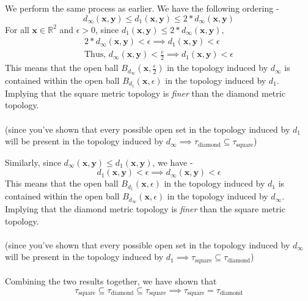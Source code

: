 \begin{frame}
    We perform the same process as earlier. We have the following ordering -
    \begin{equation*}
        d_\infty(\boldsymbol{x}, \boldsymbol{y}) \leq d_1(\boldsymbol{x}, \boldsymbol{y}) \leq 2*d_\infty(\boldsymbol{x}, \boldsymbol{y})
    \end{equation*}
    \pause
    For all $\boldsymbol{x} \in \mathbb{R}^2$ and $\epsilon > 0$, since $d_1(\boldsymbol{x}, \boldsymbol{y}) \leq 2*d_\infty(\boldsymbol{x}, \boldsymbol{y})$,
    \begin{gather*}
         2*d_\infty(\boldsymbol{x}, \boldsymbol{y}) < \epsilon \implies d_1(\boldsymbol{x}, \boldsymbol{y}) < \epsilon \\
         \text{Thus, }d_\infty(\boldsymbol{x}, \boldsymbol{y}) < \frac{\epsilon}{2} \implies d_1(\boldsymbol{x}, \boldsymbol{y}) < \epsilon
    \end{gather*}
    \pause
    This means that the open ball $B_{d_\infty}\left(\boldsymbol{x}, \frac{\epsilon}{2}\right)$ in the topology induced by $d_{\infty}$ is contained within the open ball $B_{d_1}\left(\boldsymbol{x}, \epsilon\right)$ in the topology induced by $d_1$. Implying that the square metric topology is \textit{finer} than the diamond metric topology. \\\\
    (since you've shown that every possible open set in the topology induced by $d_1$ will be present in the topology induced by $d_\infty \implies \tau_{\text{diamond}} \subseteq \tau_{\text{square}}$)
\end{frame}

\begin{frame}
    Similarly, since $d_\infty(\boldsymbol{x}, \boldsymbol{y}) \leq d_1(\boldsymbol{x}, \boldsymbol{y})$, we have -
    \begin{equation*}
        d_1(\boldsymbol{x}, \boldsymbol{y}) < \epsilon \implies d_\infty(\boldsymbol{x}, \boldsymbol{y}) < \epsilon
    \end{equation*}
    \pause
    This means that the open ball $B_{d_1}\left(\boldsymbol{x}, \epsilon\right)$ in the topology induced by $d_1$ is contained within the open ball $B_{d_\infty}\left(\boldsymbol{x}, \epsilon\right)$ in the topology induced by $d_\infty$. Implying that the diamond metric topology is \textit{finer} than the square metric topology. \\\\
    (since you've shown that every possible open set in the topology induced by $d_\infty$ will be present in the topology induced by $d_1 \implies \tau_{\text{square}} \subseteq \tau_{\text{diamond}}$) \\\\
    \pause
    Combining the two results together, we have shown that 
    \begin{equation*}
        \tau_{\text{square}} \subseteq \tau_{\text{diamond}} \subseteq \tau_{\text{square}} \implies \tau_{\text{square}} = \tau_{\text{diamond}}
    \end{equation*}
\end{frame}

